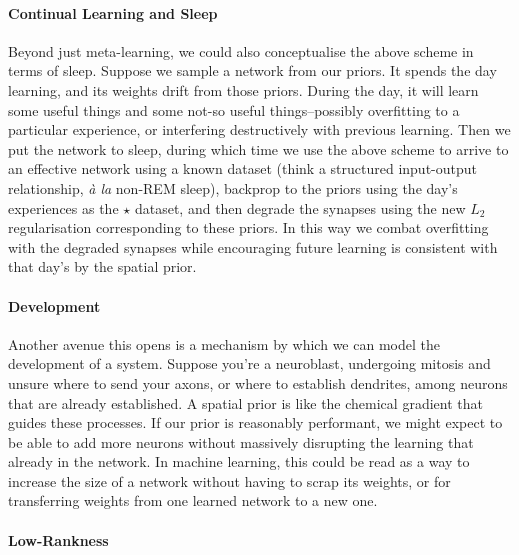 \documentclass[../main.tex]{subfiles}
\begin{document}
\paragraph{Continual Learning and Sleep}

Beyond just meta-learning, we could also conceptualise the above scheme in terms of sleep. Suppose we sample a network from our priors. It spends the day learning, and its weights drift from those priors. During the day, it will learn some useful things and some not-so useful things--possibly overfitting to a particular experience, or interfering destructively with previous learning. Then we put the network to sleep, during which time we use the above scheme to arrive to an effective network using a known dataset (think a structured input-output relationship, \textit{à la} non-REM sleep), backprop to the priors using the day's experiences as the $\star$ dataset, and then degrade the synapses using the new $L_2$ regularisation corresponding to these priors. In this way we combat overfitting with the degraded synapses while encouraging future learning is consistent with that day's by the spatial prior.

\paragraph{Development}

Another avenue this opens is a mechanism by which we can model the development of a  system. Suppose you're a neuroblast, undergoing mitosis and unsure where to send your axons, or where to establish dendrites, among neurons that are already established. A spatial prior is like the chemical gradient that guides these processes. If our prior is reasonably performant,  we might expect to be able to add more neurons without massively disrupting the learning that  already  in the network. In machine learning, this could be read as a way to increase the size of a network without having to scrap its weights, or for transferring weights from one learned network to a new one.

\paragraph{Low-Rankness}
\end{document}
